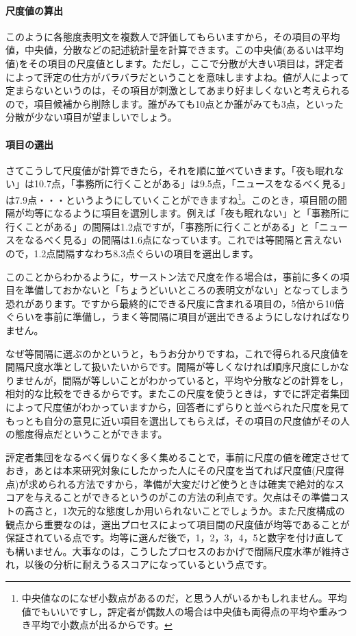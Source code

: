 \documentclass{ltjsbook}
\begin{document}
\paragraph{尺度値の算出}このように各態度表明文を複数人で評価してもらいますから，その項目の平均値，中央値，分散などの記述統計量を計算できます。この中央値(あるいは平均値)をその項目の尺度値とします。ただし，ここで分散が大きい項目は，評定者によって評定の仕方がバラバラだということを意味しますよね。値が人によって定まらないというのは，その項目が刺激としてあまり好ましくないと考えられるので，項目候補から削除します。誰がみても10点とか誰がみても3点，といった分散が少ない項目が望ましいでしょう。

\paragraph{項目の選出}さてこうして尺度値が計算できたら，それを順に並べていきます。「夜も眠れない」は10.7点，「事務所に行くことがある」は9.5点，「ニュースをなるべく見る」は7.9点・・・というようにしていくことができますね\footnote{中央値なのになぜ小数点があるのだ，と思う人がいるかもしれません。平均値でもいいですし，評定者が偶数人の場合は中央値も両得点の平均や重みつき平均で小数点が出るからです。}。このとき，項目間の間隔が均等になるように項目を選別します。例えば「夜も眠れない」と「事務所に行くことがある」の間隔は1.2点ですが，「事務所に行くことがある」と「ニュースをなるべく見る」の間隔は1.6点になっています。これでは等間隔と言えないので，1.2点間隔すなわち8.3点ぐらいの項目を選出します。

このことからわかるように，サーストン法で尺度を作る場合は，事前に多くの項目を準備しておかないと「ちょうどいいところの表明文がない」となってしまう恐れがあります。ですから最終的にできる尺度に含まれる項目の，5倍から10倍ぐらいを事前に準備し，うまく等間隔に項目が選出できるようにしなければなりません。

なぜ等間隔に選ぶのかというと，もうお分かりですね，これで得られる尺度値を間隔尺度水準として扱いたいからです。間隔が等しくなければ順序尺度にしかなりませんが，間隔が等しいことがわかっていると，平均や分散などの計算をし，相対的な比較をできるからです。またこの尺度を使うときは，すでに評定者集団によって尺度値がわかっていますから，回答者にずらりと並べられた尺度を見てもっとも自分の意見に近い項目を選出してもらえば，その項目の尺度値がその人の態度得点だということができます。

評定者集団をなるべく偏りなく多く集めることで，事前に尺度の値を確定させておき，あとは本来研究対象にしたかった人にその尺度を当てれば尺度値(尺度得点)が求められる方法ですから，準備が大変だけど使うときは確実で絶対的なスコアを与えることができるというのがこの方法の利点です。欠点はその準備コストの高さと，1次元的な態度しか用いられないことでしょうか。また尺度構成の観点から重要なのは，選出プロセスによって項目間の尺度値が均等であることが保証されている点です。均等に選んだ後で，1，2，3，4，5と数字を付け直しても構いません。大事なのは，こうしたプロセスのおかげで間隔尺度水準が維持され，以後の分析に耐えうるスコアになっているという点です。
\end{document}
